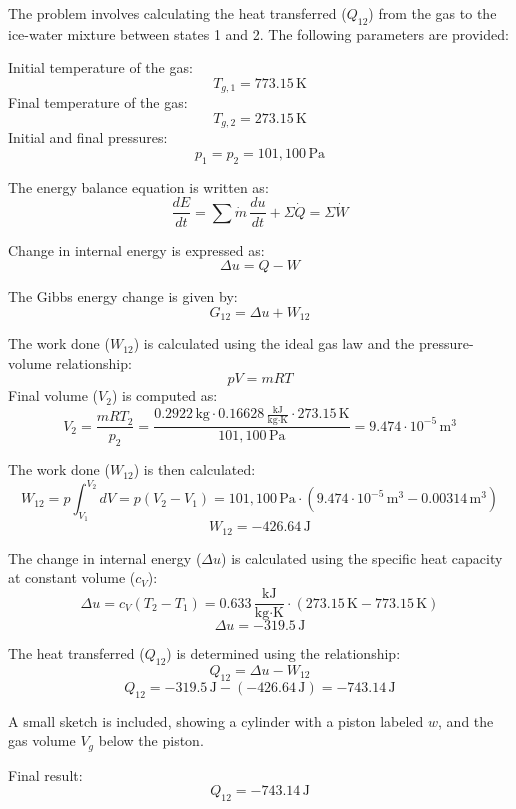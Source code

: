 The problem involves calculating the heat transferred (\( Q_{12} \)) from the gas to the ice-water mixture between states 1 and 2. The following parameters are provided:  

Initial temperature of the gas:  
\[
T_{g,1} = 773.15 \, \text{K}
\]  
Final temperature of the gas:  
\[
T_{g,2} = 273.15 \, \text{K}
\]  
Initial and final pressures:  
\[
p_1 = p_2 = 101{,}100 \, \text{Pa}
\]  

The energy balance equation is written as:  
\[
\frac{dE}{dt} = \sum \dot{m} \, \frac{du}{dt} + \Sigma \dot{Q} = \Sigma \dot{W}
\]  

Change in internal energy is expressed as:  
\[
\Delta u = Q - W
\]  

The Gibbs energy change is given by:  
\[
G_{12} = \Delta u + W_{12}
\]  

The work done (\( W_{12} \)) is calculated using the ideal gas law and the pressure-volume relationship:  
\[
pV = mRT
\]  
Final volume (\( V_2 \)) is computed as:  
\[
V_2 = \frac{mRT_2}{p_2} = \frac{0.2922 \, \text{kg} \cdot 0.16628 \, \frac{\text{kJ}}{\text{kg·K}} \cdot 273.15 \, \text{K}}{101{,}100 \, \text{Pa}} = 9.474 \cdot 10^{-5} \, \text{m}^3
\]  

The work done (\( W_{12} \)) is then calculated:  
\[
W_{12} = p \int_{V_1}^{V_2} dV = p(V_2 - V_1) = 101{,}100 \, \text{Pa} \cdot (9.474 \cdot 10^{-5} \, \text{m}^3 - 0.00314 \, \text{m}^3)
\]  
\[
W_{12} = -426.64 \, \text{J}
\]  

The change in internal energy (\( \Delta u \)) is calculated using the specific heat capacity at constant volume (\( c_V \)):  
\[
\Delta u = c_V (T_2 - T_1) = 0.633 \, \frac{\text{kJ}}{\text{kg·K}} \cdot (273.15 \, \text{K} - 773.15 \, \text{K})
\]  
\[
\Delta u = -319.5 \, \text{J}
\]  

The heat transferred (\( Q_{12} \)) is determined using the relationship:  
\[
Q_{12} = \Delta u - W_{12}
\]  
\[
Q_{12} = -319.5 \, \text{J} - (-426.64 \, \text{J}) = -743.14 \, \text{J}
\]  

A small sketch is included, showing a cylinder with a piston labeled \( w \), and the gas volume \( V_g \) below the piston.  

Final result:  
\[
Q_{12} = -743.14 \, \text{J}
\]